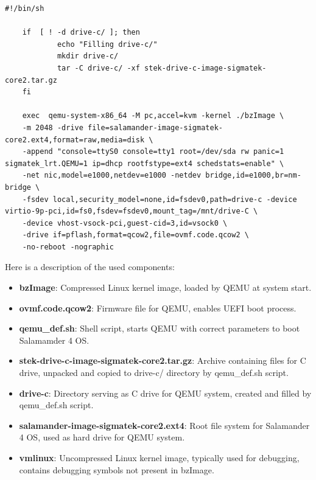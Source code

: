 \documentclass[MMR,Master,english]{twbook}
\begin{document}
\vspace{1em}
\begin{minipage}{\linewidth}
	\begin{lstlisting}[name={QEMU script for starting Salamander 4 virtualisation},label={script:qemu_def}]
    #!/bin/sh

    if  [ ! -d drive-c/ ]; then
            echo "Filling drive-c/"
            mkdir drive-c/
            tar -C drive-c/ -xf stek-drive-c-image-sigmatek-core2.tar.gz
    fi
    
    exec  qemu-system-x86_64 -M pc,accel=kvm -kernel ./bzImage \
    -m 2048 -drive file=salamander-image-sigmatek-core2.ext4,format=raw,media=disk \
    -append "console=ttyS0 console=tty1 root=/dev/sda rw panic=1 sigmatek_lrt.QEMU=1 ip=dhcp rootfstype=ext4 schedstats=enable" \
    -net nic,model=e1000,netdev=e1000 -netdev bridge,id=e1000,br=nm-bridge \
    -fsdev local,security_model=none,id=fsdev0,path=drive-c -device virtio-9p-pci,id=fs0,fsdev=fsdev0,mount_tag=/mnt/drive-C \
    -device vhost-vsock-pci,guest-cid=3,id=vsock0 \
    -drive if=pflash,format=qcow2,file=ovmf.code.qcow2 \
    -no-reboot -nographic
\end{lstlisting}
\end{minipage}
\clearpage
Here is a description of the used components:
\begin{itemize}
	\item \textbf{bzImage}: Compressed Linux kernel image, loaded by QEMU at system start.
	\item \textbf{ovmf.code.qcow2}: Firmware file for QEMU, enables UEFI boot process.
	\item \textbf{qemu\_def.sh}: Shell script, starts QEMU with correct parameters to boot Salamamder 4 OS.
	\item \textbf{stek-drive-c-image-sigmatek-core2.tar.gz}: Archive containing files for C drive, unpacked and copied to drive-c/ directory by qemu\_def.sh script.
	\item \textbf{drive-c}: Directory serving as C drive for QEMU system, created and filled by qemu\_def.sh script.
	\item \textbf{salamander-image-sigmatek-core2.ext4}: Root file system for Salamander 4 OS, used as hard drive for QEMU system.
	\item \textbf{vmlinux}: Uncompressed Linux kernel image, typically used for debugging, contains debugging symbols not present in bzImage.
\end{itemize}
\end{document}
